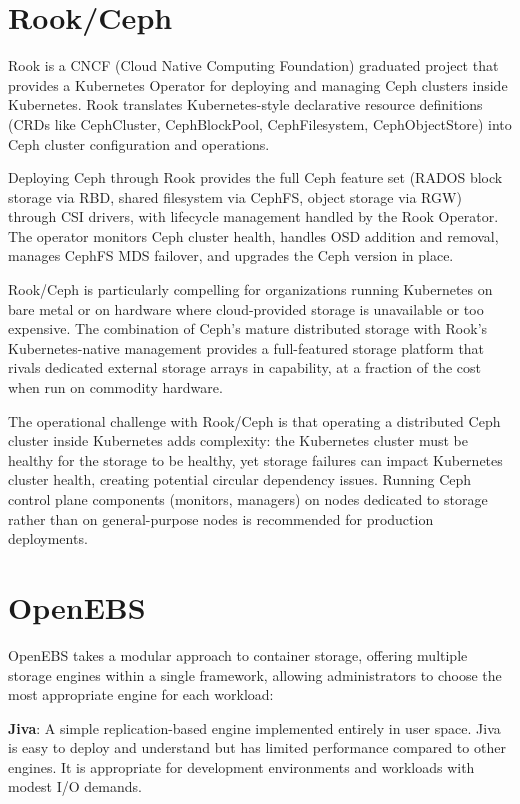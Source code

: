 \section{Rook/Ceph}
Rook is a CNCF (Cloud Native Computing Foundation) graduated project that provides a Kubernetes Operator for deploying and managing Ceph clusters inside Kubernetes. Rook translates Kubernetes-style declarative resource definitions (CRDs like CephCluster, CephBlockPool, CephFilesystem, CephObjectStore) into Ceph cluster configuration and operations.

Deploying Ceph through Rook provides the full Ceph feature set (RADOS block storage via RBD, shared filesystem via CephFS, object storage via RGW) through CSI drivers, with lifecycle management handled by the Rook Operator. The operator monitors Ceph cluster health, handles OSD addition and removal, manages CephFS MDS failover, and upgrades the Ceph version in place.

Rook/Ceph is particularly compelling for organizations running Kubernetes on bare metal or on hardware where cloud-provided storage is unavailable or too expensive. The combination of Ceph's mature distributed storage with Rook's Kubernetes-native management provides a full-featured storage platform that rivals dedicated external storage arrays in capability, at a fraction of the cost when run on commodity hardware.

The operational challenge with Rook/Ceph is that operating a distributed Ceph cluster inside Kubernetes adds complexity: the Kubernetes cluster must be healthy for the storage to be healthy, yet storage failures can impact Kubernetes cluster health, creating potential circular dependency issues. Running Ceph control plane components (monitors, managers) on nodes dedicated to storage rather than on general-purpose nodes is recommended for production deployments.

\section{OpenEBS}
OpenEBS takes a modular approach to container storage, offering multiple storage engines within a single framework, allowing administrators to choose the most appropriate engine for each workload:

\textbf{Jiva}: A simple replication-based engine implemented entirely in user space. Jiva is easy to deploy and understand but has limited performance compared to other engines. It is appropriate for development environments and workloads with modest I/O demands.

